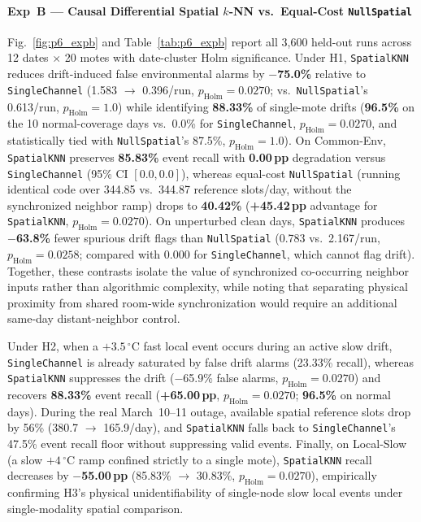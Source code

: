 \documentclass[journal,twoside,web]{ieeecolor}
\begin{document}
\paragraph{Exp~B --- Causal Differential Spatial $k$-NN vs.\ Equal-Cost \texttt{NullSpatial}}
Fig.~\ref{fig:p6_expb} and Table~\ref{tab:p6_expb} report all 3,600 held-out runs across 12 dates $\times$ 20 motes with date-cluster Holm significance. Under H1, \texttt{SpatialKNN} reduces drift-induced false environmental alarms by \textbf{$-$75.0\%} relative to \texttt{SingleChannel} (1.583 $\to$ 0.396/run, $p_{\text{Holm}}{=}0.0270$; vs.\ \texttt{NullSpatial}'s 0.613/run, $p_{\text{Holm}}{=}1.0$) while identifying \textbf{88.33\%} of single-mote drifts (\textbf{96.5\%} on the 10 normal-coverage days vs.\ 0.0\% for \texttt{SingleChannel}, $p_{\text{Holm}}{=}0.0270$, and statistically tied with \texttt{NullSpatial}'s 87.5\%, $p_{\text{Holm}}{=}1.0$). On Common-Env, \texttt{SpatialKNN} preserves \textbf{85.83\%} event recall with \textbf{0.00\,pp} degradation versus \texttt{SingleChannel} (95\% CI $[0.0, 0.0]$), whereas equal-cost \texttt{NullSpatial} (running identical code over 344.85 vs.\ 344.87 reference slots/day, without the synchronized neighbor ramp) drops to \textbf{40.42\%} (\textbf{+45.42\,pp} advantage for \texttt{SpatialKNN}, $p_{\text{Holm}}{=}0.0270$). On unperturbed clean days, \texttt{SpatialKNN} produces \textbf{$-$63.8\%} fewer spurious drift flags than \texttt{NullSpatial} (0.783 vs.\ 2.167/run, $p_{\text{Holm}}{=}0.0258$; compared with 0.000 for \texttt{SingleChannel}, which cannot flag drift). Together, these contrasts isolate the value of synchronized co-occurring neighbor inputs rather than algorithmic complexity, while noting that separating physical proximity from shared room-wide synchronization would require an additional same-day distant-neighbor control.

Under H2, when a $+3.5\,^{\circ}\text{C}$ fast local event occurs during an active slow drift, \texttt{SingleChannel} is already saturated by false drift alarms (23.33\% recall), whereas \texttt{SpatialKNN} suppresses the drift ($-$65.9\% false alarms, $p_{\text{Holm}}{=}0.0270$) and recovers \textbf{88.33\%} event recall (\textbf{+65.00\,pp}, $p_{\text{Holm}}{=}0.0270$; \textbf{96.5\%} on normal days). During the real March~10--11 outage, available spatial reference slots drop by 56\% (380.7 $\to$ 165.9/day), and \texttt{SpatialKNN} falls back to \texttt{SingleChannel}'s 47.5\% event recall floor without suppressing valid events. Finally, on Local-Slow (a slow $+4\,^{\circ}\text{C}$ ramp confined strictly to a single mote), \texttt{SpatialKNN} recall decreases by \textbf{$-$55.00\,pp} (85.83\% $\to$ 30.83\%, $p_{\text{Holm}}{=}0.0270$), empirically confirming H3's physical unidentifiability of single-node slow local events under single-modality spatial comparison.
\end{document}
